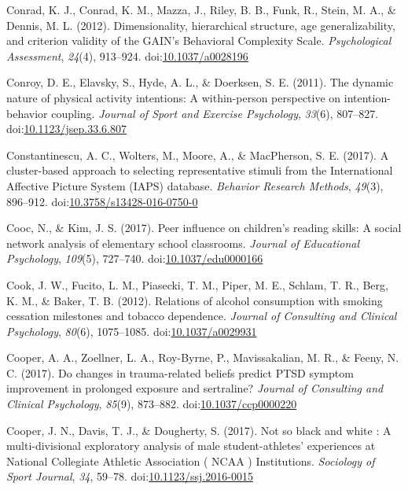 \documentclass[english,man]{apa6}
\theoremstyle{definition}
\theoremstyle{definition}
\theoremstyle{definition}
\theoremstyle{remark}
\begin{document}
\hypertarget{ref-Conrad2012}{}
Conrad, K. J., Conrad, K. M., Mazza, J., Riley, B. B., Funk, R., Stein,
M. A., \& Dennis, M. L. (2012). Dimensionality, hierarchical structure,
age generalizability, and criterion validity of the GAIN's Behavioral
Complexity Scale. \emph{Psychological Assessment}, \emph{24}(4),
913--924. doi:\href{https://doi.org/10.1037/a0028196}{10.1037/a0028196}

\hypertarget{ref-Conroy2011}{}
Conroy, D. E., Elavsky, S., Hyde, A. L., \& Doerksen, S. E. (2011). The
dynamic nature of physical activity intentions: A within-person
perspective on intention-behavior coupling. \emph{Journal of Sport and
Exercise Psychology}, \emph{33}(6), 807--827.
doi:\href{https://doi.org/10.1123/jsep.33.6.807}{10.1123/jsep.33.6.807}

\hypertarget{ref-Constantinescu2017}{}
Constantinescu, A. C., Wolters, M., Moore, A., \& MacPherson, S. E.
(2017). A cluster-based approach to selecting representative stimuli
from the International Affective Picture System (IAPS) database.
\emph{Behavior Research Methods}, \emph{49}(3), 896--912.
doi:\href{https://doi.org/10.3758/s13428-016-0750-0}{10.3758/s13428-016-0750-0}

\hypertarget{ref-Cooc2017}{}
Cooc, N., \& Kim, J. S. (2017). Peer influence on children's reading
skills: A social network analysis of elementary school classrooms.
\emph{Journal of Educational Psychology}, \emph{109}(5), 727--740.
doi:\href{https://doi.org/10.1037/edu0000166}{10.1037/edu0000166}

\hypertarget{ref-Cook2012}{}
Cook, J. W., Fucito, L. M., Piasecki, T. M., Piper, M. E., Schlam, T.
R., Berg, K. M., \& Baker, T. B. (2012). Relations of alcohol
consumption with smoking cessation milestones and tobacco dependence.
\emph{Journal of Consulting and Clinical Psychology}, \emph{80}(6),
1075--1085.
doi:\href{https://doi.org/10.1037/a0029931}{10.1037/a0029931}

\hypertarget{ref-Cooper2017a}{}
Cooper, A. A., Zoellner, L. A., Roy-Byrne, P., Mavissakalian, M. R., \&
Feeny, N. C. (2017). Do changes in trauma-related beliefs predict PTSD
symptom improvement in prolonged exposure and sertraline? \emph{Journal
of Consulting and Clinical Psychology}, \emph{85}(9), 873--882.
doi:\href{https://doi.org/10.1037/ccp0000220}{10.1037/ccp0000220}

\hypertarget{ref-Cooper2017}{}
Cooper, J. N., Davis, T. J., \& Dougherty, S. (2017). Not so black and
white : A multi-divisional exploratory analysis of male
student-athletes' experiences at National Collegiate Athletic
Association ( NCAA ) Institutions. \emph{Sociology of Sport Journal},
\emph{34}, 59--78.
doi:\href{https://doi.org/10.1123/ssj.2016-0015}{10.1123/ssj.2016-0015}
\end{document}
